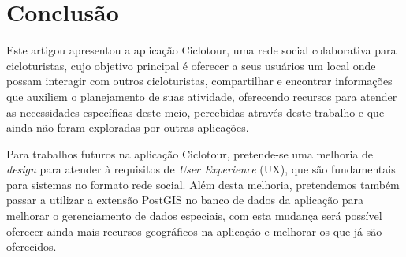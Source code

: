 \section{Conclusão}
Este artigou apresentou a aplicação Ciclotour, uma rede social colaborativa para cicloturistas, cujo objetivo principal é oferecer a seus usuários 
um local onde possam interagir com outros cicloturistas, compartilhar e encontrar informações que auxiliem o planejamento de suas atividade, 
oferecendo recursos para atender as necessidades específicas deste meio, percebidas através deste trabalho e que ainda não foram exploradas por 
outras aplicações.

Para trabalhos futuros na aplicação Ciclotour, pretende-se uma melhoria de \textit{design} para atender à requisitos de \textit{User Experience} (UX),
que são fundamentais para sistemas no formato rede social. Além desta melhoria, pretendemos também passar a utilizar a extensão PostGIS no banco de 
dados da aplicação para melhorar o gerenciamento de dados especiais, com esta mudança será possível oferecer ainda mais recursos geográficos na 
aplicação e melhorar os que já são oferecidos.



